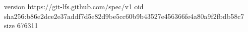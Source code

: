 version https://git-lfs.github.com/spec/v1
oid sha256:b86e2dce2e37addf7d5e82d9be5cc60b9b43527e456366fe4a80a9f2fbdb58c7
size 676311
